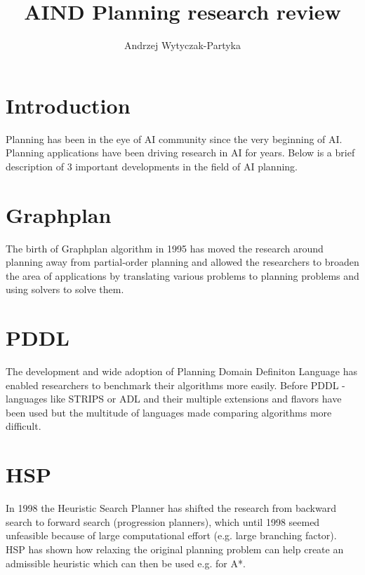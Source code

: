 \documentclass[12pt, a4paper]{article}
\author{Andrzej Wytyczak-Partyka}
\title{AIND Planning research review}
\begin{document}
\maketitle

\section{Introduction}
Planning has been in the eye of AI community since the very beginning of AI.
Planning applications have been driving research in AI for years. Below is a brief description
of 3 important developments in the field of AI planning.

\section{Graphplan}
The birth of Graphplan algorithm in 1995 \cite{blum1997fast} has moved the research around planning away from
partial-order planning and allowed the researchers to broaden the area of applications by translating
various problems to planning problems and using solvers to solve them.

\section{PDDL}
The development and wide adoption of Planning Domain Definiton Language \cite{mcdermott1998pddl} has enabled researchers
to benchmark their algorithms more easily. Before PDDL - languages like STRIPS or ADL and their multiple
extensions and flavors have been used but the multitude of languages made comparing algorithms
more difficult.

\section{HSP}
In 1998 the Heuristic Search Planner \cite{bonet1999planning} has shifted the research from backward search
to forward search (progression planners), which until 1998 seemed unfeasible
because of large computational effort (e.g. large branching factor). HSP has shown
how relaxing the original planning problem can help create an admissible heuristic
which can then be used e.g. for A*.


\printbibliography
\end{document}
